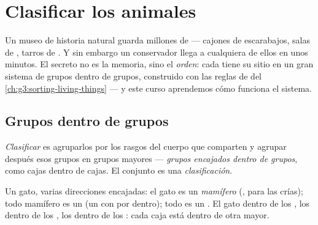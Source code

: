 \chapter{Clasificar los animales}\label{ch:g4:classifying-animals}

Un museo de historia natural guarda millones de  --- cajones
de escarabajos, salas de , tarros de . Y sin embargo un
conservador llega a cualquiera de ellos en unos minutos. El secreto no
es la memoria, sino el \emph{orden}: cada  tiene su sitio en un
gran sistema de grupos dentro de grupos, construido con las reglas de
 del \cref{ch:g3:sorting-living-things} --- y este curso
aprendemos cómo funciona el sistema.

\section{Grupos dentro de grupos}

\begin{definition}[Clasificación]\label{def:g4:classifying-animals:classification}
\emph{Clasificar}  es agruparlos por los
rasgos del cuerpo que comparten y agrupar después esos grupos en
grupos mayores --- \emph{grupos encajados dentro de
grupos}, como cajas dentro de cajas. El
conjunto es una \emph{clasificación}.
\end{definition}

\begin{example}\label{ex:g4:classifying-animals:cat}
Un gato, varias direcciones encajadas: el gato es un \emph{mamífero}
(,  para las crías); todo mamífero es un \emph{}
(un  con  por dentro); todo  es un
\emph{}. El gato dentro de los , los  dentro
de los , los  dentro de los : cada caja
está dentro de otra mayor.
\end{example}

